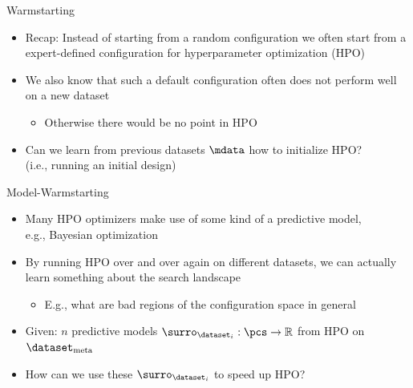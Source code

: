 \begin{frame}[c]{Warmstarting}
	
\begin{itemize}
	\item Recap: Instead of starting from a random configuration we often start from a expert-defined configuration for hyperparameter optimization (HPO)
	\pause
	\item We also know that such a default configuration often does not perform well on a new dataset
	\begin{itemize}
		\item Otherwise there would be no point in HPO
	\end{itemize}
	\pause
	\item \alert{Can we learn from previous datasets $\mdata$ how to initialize HPO?}\\
	(i.e., running an initial design)
\end{itemize}

\end{frame}
\begin{frame}[c]{Model-Warmstarting}

\begin{itemize}
	\item Many HPO optimizers make use of some kind of a predictive model,\\
	e.g., Bayesian optimization
	\item By running HPO over and over again on different datasets,
	we can actually learn something about the search landscape
	\begin{itemize}
		\item E.g., what are bad regions of the configuration space in general
	\end{itemize}
	\smallskip
	\item Given: $n$ predictive models $\surro_{\dataset_i}: \pcs \to \mathbb{R}$ from HPO on $\dataset_{\text{meta}}$	
	\item \alert{How can we use these $\surro_{\dataset_i}$ to speed up HPO?}
\end{itemize}


\end{frame}

